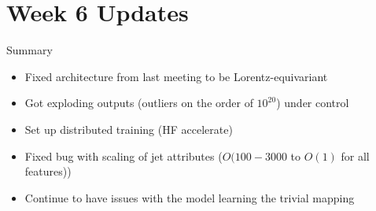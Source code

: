 \documentclass[handout, aspectratio=169,xcolor=dvipsnames]{beamer}
\begin{document}
\section{Week 6 Updates}

\begin{frame}{Summary}
    \begin{itemize}
        \item Fixed architecture from last meeting to be Lorentz-equivariant 
        \item Got exploding outputs (outliers on the order of $10^{20}$) under control
        \item Set up distributed training (HF accelerate)
        \item Fixed bug with scaling of jet attributes ($O(100-3000$ to $O(1)$ for all features))
        \item Continue to have issues with the model learning the trivial mapping
    \end{itemize}
\end{frame}
\end{document}

